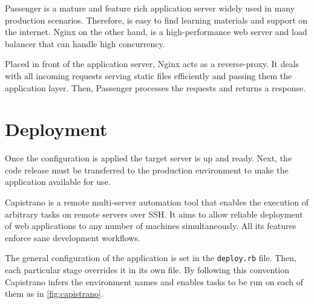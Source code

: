 Passenger is a mature and feature rich application server widely used in many production scenarios. Therefore, is easy to find learning materials and support on the internet. Nginx on the other hand, is a high-performance web server and load balancer that can handle high concurrency.

Placed in front of the application server, Nginx acts as a reverse-proxy. It deals with all incoming requests serving static files efficiently and passing them the application layer. Then, Passenger processes the requests and returns a response.

\section{Deployment}

Once the configuration is applied the target server is up and ready. Next, the code release must be transferred to the production environment to make the application available for use.

Capistrano is a remote multi-server automation tool that enables the execution of arbitrary tasks on remote servers over SSH. It aims to allow reliable deployment of web applications to any number of machines simultaneously. All its features enforce sane development workflows.

The general configuration of the application is set in the \texttt{deploy.rb} file. Then, each particular stage overrides it in its own file. By following this convention Capistrano infers the environment names and enables tasks to be run on each of them as in \ref{fig:capistrano}.


